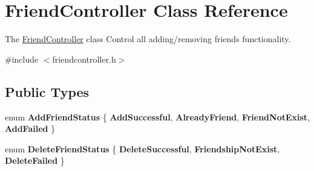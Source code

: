\hypertarget{classFriendController}{}\section{Friend\+Controller Class Reference}
\label{classFriendController}


The \hyperlink{classFriendController}{Friend\+Controller} class Control all adding/removing friends functionality.  




{\ttfamily \#include $<$friendcontroller.\+h$>$}

\subsection*{Public Types}
\begin{DoxyCompactItemize}
\item 
enum {\bfseries Add\+Friend\+Status} \{ {\bfseries Add\+Successful}, 
{\bfseries Already\+Friend}, 
{\bfseries Friend\+Not\+Exist}, 
{\bfseries Add\+Failed}
 \}\hypertarget{classFriendController_a4db3238a6f2e8ce12624a92e81547db5}{}\label{classFriendController_a4db3238a6f2e8ce12624a92e81547db5}

\item 
enum {\bfseries Delete\+Friend\+Status} \{ {\bfseries Delete\+Successful}, 
{\bfseries Friendship\+Not\+Exist}, 
{\bfseries Delete\+Failed}
 \}\hypertarget{classFriendController_ad5ddfa0b7d2b2eb5dee143f0aa8363b0}{}\label{classFriendController_ad5ddfa0b7d2b2eb5dee143f0aa8363b0}

\end{DoxyCompactItemize}
